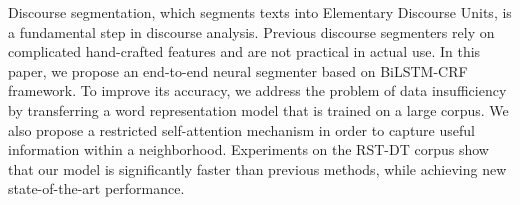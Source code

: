 Discourse segmentation, which segments texts into Elementary Discourse Units, is a fundamental step in discourse analysis. Previous discourse segmenters rely on complicated hand-crafted features and are not practical in actual use. In this paper, we propose an end-to-end neural segmenter based on BiLSTM-CRF framework. To improve its accuracy, we address the problem of data insufficiency by transferring a word representation model that is trained on a large corpus. We also propose a restricted self-attention mechanism in order to capture useful information within a neighborhood. Experiments on the RST-DT corpus show that our model is significantly faster than previous methods, while achieving new state-of-the-art performance.

